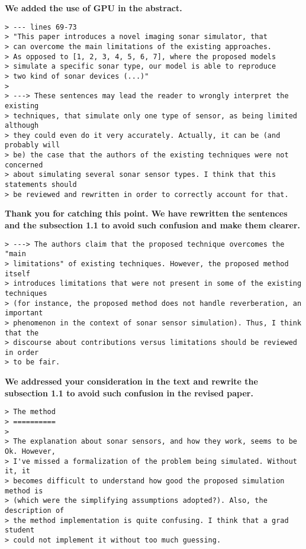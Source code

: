 \documentclass{article}
\begin{document}
\textbf{We added the use of GPU in the abstract.}


\begin{verbatim}
> --- lines 69-73
> "This paper introduces a novel imaging sonar simulator, that
> can overcome the main limitations of the existing approaches.
> As opposed to [1, 2, 3, 4, 5, 6, 7], where the proposed models
> simulate a specific sonar type, our model is able to reproduce
> two kind of sonar devices (...)"
>
> ---> These sentences may lead the reader to wrongly interpret the existing
> techniques, that simulate only one type of sensor, as being limited although
> they could even do it very accurately. Actually, it can be (and probably will
> be) the case that the authors of the existing techniques were not concerned
> about simulating several sonar sensor types. I think that this statements should
> be reviewed and rewritten in order to correctly account for that.
\end{verbatim}

\textbf{Thank you for catching this point. We have rewritten the sentences
and the subsection 1.1 to avoid such confusion and make them clearer.}

\begin{verbatim}
> ---> The authors claim that the proposed technique overcomes the "main
> limitations" of existing techniques. However, the proposed method itself
> introduces limitations that were not present in some of the existing techniques
> (for instance, the proposed method does not handle reverberation, an important
> phenomenon in the context of sonar sensor simulation). Thus, I think that the
> discourse about contributions versus limitations should be reviewed in order
> to be fair.
\end{verbatim}

\textbf{We addressed your consideration in the text and rewrite the
subsection 1.1 to avoid such confusion in the revised paper.}

\begin{verbatim}
> The method
> ==========
>
> The explanation about sonar sensors, and how they work, seems to be Ok. However,
> I've missed a formalization of the problem being simulated. Without it, it
> becomes difficult to understand how good the proposed simulation method is
> (which were the simplifying assumptions adopted?). Also, the description of
> the method implementation is quite confusing. I think that a grad student
> could not implement it without too much guessing.
\end{verbatim}
\end{document}
